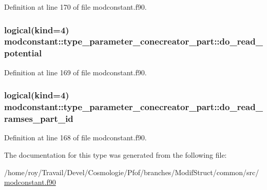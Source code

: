 Definition at line 170 of file modconstant.\-f90.

\hypertarget{structmodconstant_1_1type__parameter__conecreator__part_ad8db85990febd9c00c5a5a6a2f1d0fd7}{
\subsubsection[{do\-\_\-read\-\_\-potential}]{\setlength{\rightskip}{0pt plus 5cm}logical(kind=4) modconstant\-::type\-\_\-parameter\-\_\-conecreator\-\_\-part\-::do\-\_\-read\-\_\-potential}}\label{structmodconstant_1_1type__parameter__conecreator__part_ad8db85990febd9c00c5a5a6a2f1d0fd7}


Definition at line 169 of file modconstant.\-f90.

\hypertarget{structmodconstant_1_1type__parameter__conecreator__part_a767cd774e985d3ce50b3131eb7ffa50b}{
\subsubsection[{do\-\_\-read\-\_\-ramses\-\_\-part\-\_\-id}]{\setlength{\rightskip}{0pt plus 5cm}logical(kind=4) modconstant\-::type\-\_\-parameter\-\_\-conecreator\-\_\-part\-::do\-\_\-read\-\_\-ramses\-\_\-part\-\_\-id}}\label{structmodconstant_1_1type__parameter__conecreator__part_a767cd774e985d3ce50b3131eb7ffa50b}


Definition at line 168 of file modconstant.\-f90.



The documentation for this type was generated from the following file\-:\begin{DoxyCompactItemize}
\item 
/home/roy/\-Travail/\-Devel/\-Cosmologie/\-Pfof/branches/\-Modif\-Struct/common/src/\hyperlink{modconstant_8f90}{modconstant.\-f90}\end{DoxyCompactItemize}
